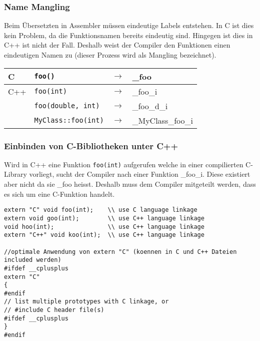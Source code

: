 \subsubsection{Name Mangling}
\begin{multicols}{2}
	Beim Übersetzten in Assembler müssen eindeutige Labels entstehen. In C ist dies kein Problem, da die Funktionsnamen bereits eindeutig sind. Hingegen ist dies in C++ ist nicht der Fall. Deshalb weist der Compiler den Funktionen einen eindeutigen Namen zu (dieser Prozess wird als Mangling bezeichnet).
\columnbreak
  \begin{tabular}{|l|lll|}
  \hline
    C   & {\lstinline!foo()!} & $\rightarrow$ & \_foo \\
  \hline
    C++ & {\lstinline!foo(int)!} & $\rightarrow$ & \_foo\_i \\
        & {\lstinline!foo(double, int)!} & $\rightarrow$ & \_foo\_d\_i \\
        & {\lstinline!MyClass::foo(int)!} & $\rightarrow$ & \_MyClass\_foo\_i \\
  \hline
  \end{tabular}
\end{multicols}

\subsubsection{Einbinden von C-Bibliotheken unter C++}
Wird in C++ eine Funktion \lstinline{foo(int)} aufgerufen welche in einer compilierten C-Library vorliegt, sucht der Compiler nach einer Funktion \_foo\_i. Diese existiert aber nicht da sie \_foo heisst. Deshalb muss dem Compiler mitgeteilt werden, dass es sich um eine C-Funktion handelt.\\

\begin{lstlisting}[style=Cpp]
extern "C" void foo(int);    \\ use C language linkage
extern void goo(int);        \\ use C++ language linkage
void hoo(int);               \\ use C++ language linkage
extern "C++" void koo(int);  \\ use C++ language linkage

//optimale Anwendung von extern "C" (koennen in C und C++ Dateien included werden)
#ifdef __cplusplus
extern "C"
{
#endif
// list multiple prototypes with C linkage, or
// #include C header file(s)
#ifdef __cplusplus
}
#endif
\end{lstlisting}


